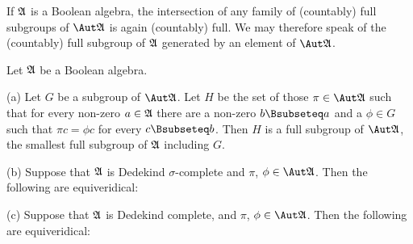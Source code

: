  If $\frak A$ is a
Boolean algebra,  the intersection of any
family of (countably) full subgroups of $\Aut\frak A$ is again
(countably) full.   We may therefore speak of the (countably) full
subgroup of $\frak A$ generated by an element of $\Aut\frak A$.

\medskip

 Let $\frak A$ be a Boolean algebra.

(a) Let $G$ be a subgroup
of $\Aut\frak A$.   Let $H$ be the set of those $\pi\in\Aut\frak A$ such
that for every non-zero $a\in\frak A$ there are a non-zero
$b\Bsubseteq a$ and a $\phi\in G$ such that $\pi c=\phi c$ for every
$c\Bsubseteq b$.
Then $H$ is a full subgroup of $\Aut\frak A$, the smallest full
subgroup of $\frak A$ including $G$.

(b) Suppose that $\frak A$ is Dedekind $\sigma$-complete and $\pi$,
$\phi\in\Aut\frak A$.   Then the following are equiveridical:


(c) Suppose that $\frak A$ is Dedekind complete, and $\pi$,
$\phi\in\Aut\frak A$.  Then the following are equiveridical:


